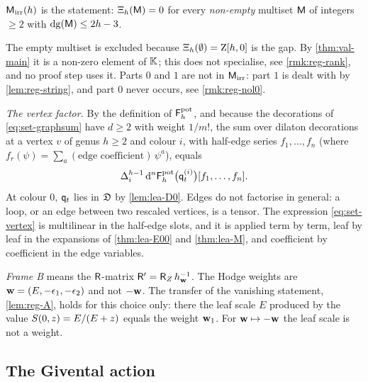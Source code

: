 \begin{defn}
\label{def:set-mirr}
$\mathsf{M}_{\mathrm{irr}}(h)$ is the statement: $\Xi_h(\mathsf{M})=0$ for every \emph{non-empty} multiset $\mathsf{M}$ of integers $\geq2$ with $\mathrm{dg}(\mathsf{M})\leq2h-3$.
\end{defn}

The empty multiset is excluded because $\Xi_h(\emptyset)=\mathrm{Z}[h,0]$ is the gap. By \cref{thm:val-main} it is a non-zero element of $\mathbb{K}$; this does not specialise, see \cref{rmk:reg-rank}, and no proof step uses it. Parts $0$ and $1$ are not in $\mathsf{M}_{\mathrm{irr}}$: part $1$ is dealt with by \cref{lem:reg-string}, and part $0$ never occurs, see \cref{rmk:reg-nol0}.

\emph{The vertex factor.} By the definition of $\mathsf{F}^{\mathrm{pot}}_h$, and because the decorations of \eqref{eq:set-graphsum} have $d\geq2$ with weight $1/m!$, the sum over dilaton decorations at a vertex $v$ of genus $h\geq2$ and colour $i$, with half-edge series $f_1,\ldots,f_n$ (where $f_r(\psi)=\sum_a(\text{edge coefficient})\,\psi^a$), equals
\begin{equation}
\label{eq:set-vertex}
\Delta_i^{h-1}\,\mathrm{d}^n\mathsf{F}^{\mathrm{pot}}_h\big(\mathsf{q}_{t}^{(i)}\big)[f_1,\ldots,f_n].
\end{equation}
At colour $0$, $\mathsf{q}_{t}$ lies in $\mathfrak{D}$ by \cref{lem:lea-D0}. Edges do not factorise in general: a loop, or an edge between two rescaled vertices, is a tensor. The expression \eqref{eq:set-vertex} is multilinear in the half-edge slots, and it is applied term by term, leaf by leaf in the expansions of \cref{thm:lea-E00} and \cref{thm:lea-M}, and coefficient by coefficient in the edge variables.

\begin{rmk}
\label{rmk:set-frame}
\emph{Frame B} means the $\mathsf{R}$-matrix $\mathsf{R}'=\mathsf{R}_Z\,h_{\mathbf{w}}^{-1}$. The Hodge weights are $\mathbf{w}=(E,-\epsilon_1,-\epsilon_2)$ and not $-\mathbf{w}$. The transfer of the vanishing statement, \cref{lem:reg-A}, holds for this choice only: there the leaf scale $E$ produced by the value $S(0,z)=E/(E+z)$ equals the weight $\mathbf{w}_1$. For $\mathbf{w}\mapsto-\mathbf{w}$ the leaf scale is not a weight.
\end{rmk}

\subsection{The Givental action}
\label{sec:set-givental}

